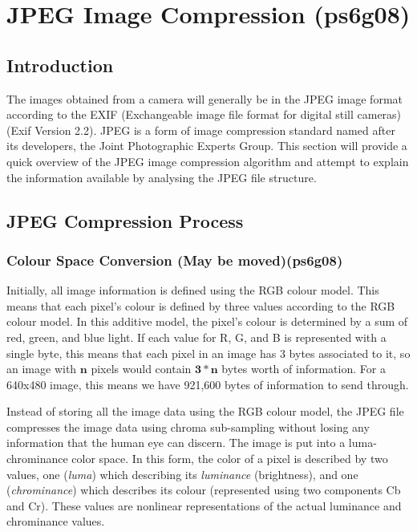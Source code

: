 
\section{JPEG Image Compression (ps6g08)}

\subsection{Introduction}
The images obtained from a camera will generally be in the JPEG image format
according to the 
EXIF (Exchangeable image file format for digital still cameras)
 (Exif Version 2.2).\cite{exif_std} 
JPEG is a form of image compression standard named after its developers, 
the Joint Photographic Experts Group. \cite{winzip_jpeg_compression}
This section will provide a quick overview of the JPEG image compression algorithm
and attempt to explain the information available by
analysing the JPEG file structure.

\subsection{JPEG Compression Process}

\subsubsection{Colour Space Conversion (May be moved)(ps6g08)}
\label{sec:colour_space_conversion}
Initially, all image information is defined using the RGB colour model.
This means that each pixel's colour is defined by three values according to the RGB colour model. 
In this additive model, the pixel's colour is determined by a sum of red, green, and blue light. 
If each value for R, G, and B is represented with a single byte, 
this means that each pixel in an image has 3 bytes associated to it, so 
an image with $\mathbf{n}$ pixels would contain $\mathbf{3*n}$ bytes worth of information. 
For a 640x480 image, this means we have 921,600 bytes of information to send through.

Instead of storing all the image data using the RGB colour model, 
the JPEG file compresses the image data using chroma sub-sampling 
without losing any information that the human eye can discern. 
The image is put into  a luma-chrominance color space. In this form, the color of a pixel is described by two values, 
one (\emph{luma}) which describing its \emph{luminance} (brightness), and 
one (\emph{chrominance}) which describes its colour 
(represented using two components Cb and Cr).
These values are nonlinear representations
of the actual luminance and chrominance values.\cite{kerr_chroma_subsampling}

